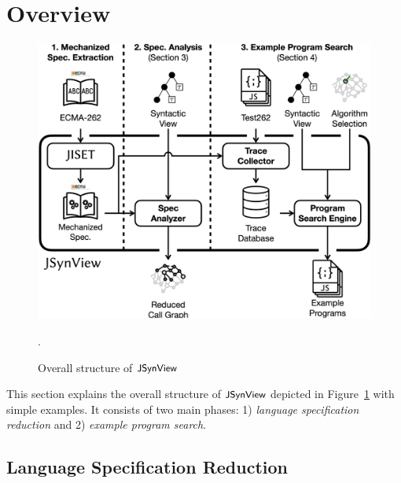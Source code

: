 \section{Overview}\label{sec:overview}

\begin{figure}
  \centering
  \includegraphics[width=\columnwidth]{img/overall.png}
  \caption{Overall structure of $\textsf{\small JSynView}$}
  \label{fig:overall}.
\end{figure}

This section explains the overall structure of $\textsf{\small JSynView}$ depicted in
Figure~\ref{fig:overall} with simple examples.  It consists of two main phases:
1) \textit{language specification reduction} and 2) \textit{example program
search}.


\subsection{Language Specification Reduction}\label{sec:reduce-spec}

